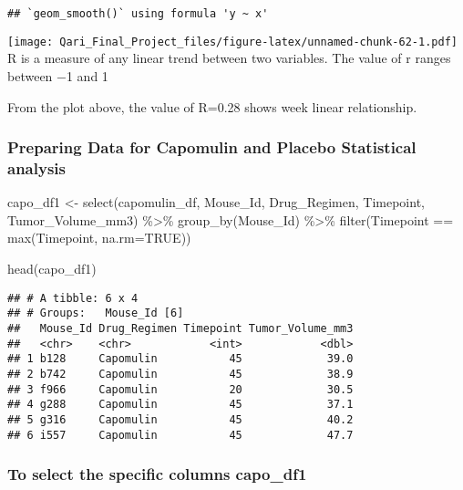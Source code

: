 \documentclass[
]{article}
\newenvironment{Shaded}{\begin{snugshade}}{\end{snugshade}}
\newcommand{\AttributeTok}[1]{\textcolor[rgb]{0.77,0.63,0.00}{#1}}
\newcommand{\ConstantTok}[1]{\textcolor[rgb]{0.00,0.00,0.00}{#1}}
\newcommand{\FunctionTok}[1]{\textcolor[rgb]{0.00,0.00,0.00}{#1}}
\newcommand{\NormalTok}[1]{#1}
\newcommand{\OtherTok}[1]{\textcolor[rgb]{0.56,0.35,0.01}{#1}}
\newcommand{\SpecialCharTok}[1]{\textcolor[rgb]{0.00,0.00,0.00}{#1}}
\begin{document}
\begin{verbatim}
## `geom_smooth()` using formula 'y ~ x'
\end{verbatim}

\texttt{[image: Qari\_Final\_Project\_files/figure-latex/unnamed-chunk-62-1.pdf]}
R is a measure of any linear trend between two variables. The value of r
ranges between −1 and 1

From the plot above, the value of R=0.28 shows week linear relationship.

\hypertarget{preparing-data-for-capomulin-and-placebo-statistical-analysis}{%
\subsubsection{Preparing Data for Capomulin and Placebo Statistical
analysis}\label{preparing-data-for-capomulin-and-placebo-statistical-analysis}}

\begin{Shaded}
\begin{Highlighting}[]
\NormalTok{capo\_df1 }\OtherTok{\textless{}{-}} \FunctionTok{select}\NormalTok{(capomulin\_df, Mouse\_Id, Drug\_Regimen, Timepoint, Tumor\_Volume\_mm3) }\SpecialCharTok{\%\textgreater{}\%}
  \FunctionTok{group\_by}\NormalTok{(Mouse\_Id) }\SpecialCharTok{\%\textgreater{}\%}
  \FunctionTok{filter}\NormalTok{(Timepoint }\SpecialCharTok{==} \FunctionTok{max}\NormalTok{(Timepoint, }\AttributeTok{na.rm=}\ConstantTok{TRUE}\NormalTok{))}

\FunctionTok{head}\NormalTok{(capo\_df1)}
\end{Highlighting}
\end{Shaded}

\begin{verbatim}
## # A tibble: 6 x 4
## # Groups:   Mouse_Id [6]
##   Mouse_Id Drug_Regimen Timepoint Tumor_Volume_mm3
##   <chr>    <chr>            <int>            <dbl>
## 1 b128     Capomulin           45             39.0
## 2 b742     Capomulin           45             38.9
## 3 f966     Capomulin           20             30.5
## 4 g288     Capomulin           45             37.1
## 5 g316     Capomulin           45             40.2
## 6 i557     Capomulin           45             47.7
\end{verbatim}

\hypertarget{to-select-the-specific-columns-capo_df1}{%
\subsubsection{To select the specific columns
capo\_df1}\label{to-select-the-specific-columns-capo_df1}}
\end{document}
